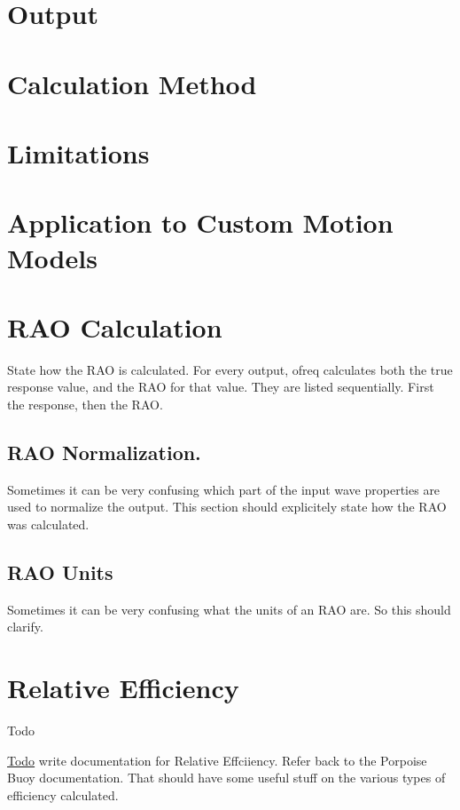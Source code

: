 \section*{Output}

\section*{Calculation Method}

\section*{Limitations}

\section*{Application to Custom Motion Models}

\section*{R\-A\-O Calculation}

State how the R\-A\-O is calculated. For every output, ofreq calculates both the true response value, and the R\-A\-O for that value. They are listed sequentially. First the response, then the R\-A\-O.

\subsection*{R\-A\-O Normalization.}

Sometimes it can be very confusing which part of the input wave properties are used to normalize the output. This section should explicitely state how the R\-A\-O was calculated.

\subsection*{R\-A\-O Units}

Sometimes it can be very confusing what the units of an R\-A\-O are. So this should clarify. \hypertarget{efficiency_relative}{}\section{Relative Efficiency}\label{efficiency_relative}
\begin{DoxyRefDesc}{Todo}
\item[\hyperlink{todo__todo000011}{Todo}]write documentation for Relative Effciiency. Refer back to the Porpoise Buoy documentation. That should have some useful stuff on the various types of efficiency calculated.\end{DoxyRefDesc}


